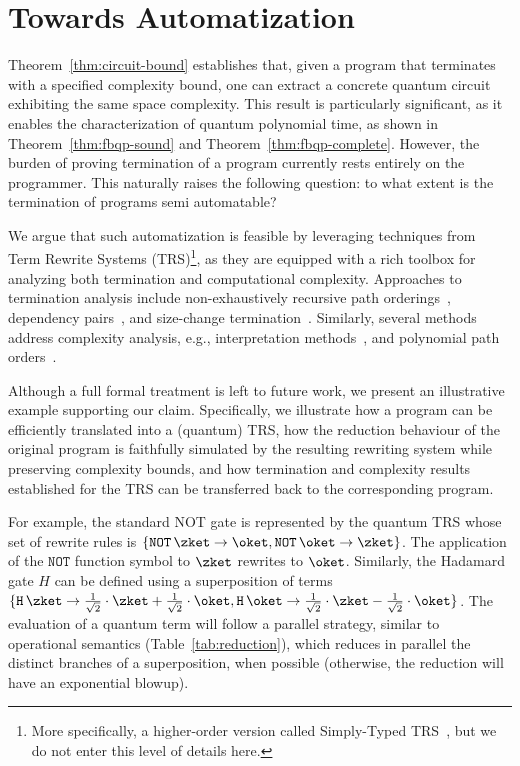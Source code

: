 \section{Towards Automatization}
\label{sec:automatization}

Theorem~\ref{thm:circuit-bound} establishes that, given a program
that terminates with a specified complexity bound, one can extract a
concrete quantum circuit exhibiting the same space complexity. This result
is particularly significant, as it enables the characterization of
 quantum polynomial time, as shown in Theorem~\ref{thm:fbqp-sound} and
 Theorem~\ref{thm:fbqp-complete}. However, the burden of proving termination of
 a \hyrql{} program currently rests entirely on the programmer.
This naturally raises the following question: to what
extent is the termination of \hyrql{} programs semi automatable?

We argue that such automatization is feasible by leveraging techniques
from Term Rewrite Systems (TRS)\footnote{More specifically, a higher-order version
called Simply-Typed TRS~\cite{Yam01}, but we do not enter this level of details
here.}, as they
are equipped with a rich toolbox for analyzing both termination and
computational complexity. Approaches to termination analysis include
non-exhaustively recursive path
orderings~\cite{Der82,Der87}, dependency pairs~\cite{AG00}, and
size-change termination~\cite{LJBA01}. Similarly, several methods
address complexity analysis, e.g.,
interpretation methods~\cite{BMM11,MP09,BDL16}, and polynomial path
orders~\cite{Moser09,AM09}.

Although a full formal treatment is left to future work, we
present an illustrative example supporting our claim. Specifically, we
illustrate how a \hyrql{} program can be efficiently translated into a (quantum) TRS,
how the reduction behaviour of the original program is faithfully
simulated by the resulting rewriting system while preserving
complexity bounds, and how termination and complexity results
established for the TRS can be transferred back to the corresponding
\hyrql{} program.


For example, the standard NOT gate is represented by the quantum TRS whose set
of rewrite rules is $ \{\mathtt{NOT}\,\zket \to \oket, \mathtt{NOT}\,\oket \to
\zket\}$. The application of the $\mathtt{NOT}$ function symbol to $\zket$
rewrites to $\oket$. Similarly, the Hadamard gate $H$ can be defined using a
superposition of terms $ \{\mathtt{H}\,\zket \to \frac{1}{\sqrt 2} \cdot \zket
+ \frac{1}{\sqrt 2} \cdot \oket, \mathtt{H}\,\oket \to  \frac{1}{\sqrt 2} \cdot
\zket - \frac{1}{\sqrt 2} \cdot \oket\}$. The evaluation of a quantum term will
follow a parallel strategy, similar to \hyrql{} operational semantics
(Table~\ref{tab:reduction}), which reduces in parallel the distinct branches of
a superposition, when possible (otherwise, the reduction will have an
exponential blowup).

